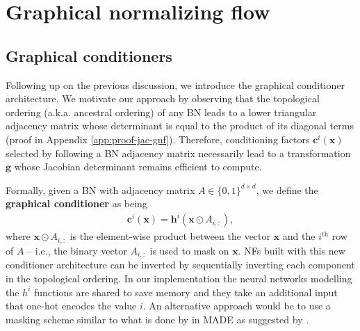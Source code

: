 \section{Graphical normalizing flow}
\subsection{Graphical conditioners}
Following up on the previous discussion, we introduce the graphical conditioner architecture.
We motivate our approach by observing that the topological ordering (a.k.a. ancestral ordering) of any BN leads to a lower triangular adjacency matrix whose determinant is equal to the product of its diagonal terms (proof in Appendix \ref{app:proof-jac-gnf}).
Therefore, conditioning factors $\mathbf{c}^i(\mathbf{x})$ selected by following a BN adjacency matrix necessarily lead to a transformation $\mathbf{g}$ whose Jacobian determinant remains efficient to compute.

Formally, given a BN with adjacency matrix $A \in \{0, 1\}^{d\times d}$, we define the \textbf{graphical conditioner} as being
\begin{align}
    \mathbf{c}^i(\mathbf{x}) = \mathbf{h}^i(\mathbf{x} \odot A_{i,:}),
\label{eq:gnf}
\end{align}
where $\mathbf{x} \odot A_{i,:}$ is the element-wise product between the vector $\mathbf{x}$ and the $i^{\text{th}}$ row of $A$ -- i.e., the binary vector $A_{i, :}$ is used to mask on $\mathbf{x}$.
NFs built with this new conditioner architecture can be inverted by sequentially inverting each component in the topological ordering.
In our implementation the neural networks modelling the $h^i$ functions are shared to save memory and they take an additional input that one-hot encodes the value $i$. An alternative approach would be to use a masking scheme similar to what is done by \citet{MADE} in MADE as suggested by \cite{DAG-3}.


